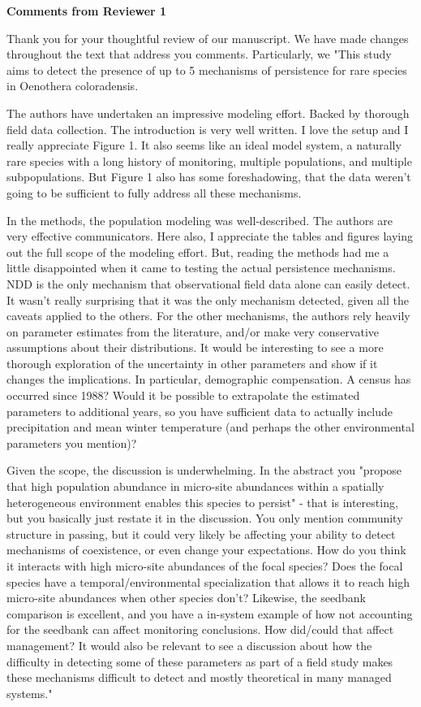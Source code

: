 \documentclass[12pt, letterpaper]{article}
\begin{document}
\textbf{Comments from Reviewer 1}

Thank you for your thoughtful review of our manuscript. We have made changes throughout the text that address you comments. Particularly, we 
"This study aims to detect the presence of up to 5 mechanisms of persistence for rare species in Oenothera coloradensis.

The authors have undertaken an impressive modeling effort. Backed by thorough field data collection.
The introduction is very well written. I love the setup and I really appreciate Figure 1. It also seems like an ideal model system, a naturally rare species with a long history of monitoring, multiple populations, and multiple subpopulations. But Figure 1 also has some foreshadowing, that the data weren't going to be sufficient to fully address all these mechanisms.

In the methods, the population modeling was well-described. The authors are very effective communicators. Here also, I appreciate the tables and figures laying out the full scope of the modeling effort. But, reading the methods had me a little disappointed when it came to testing the actual persistence mechanisms. NDD is the only mechanism that observational field data alone can easily detect. It wasn't really surprising that it was the only mechanism detected, given all the caveats applied to the others.
For the other mechanisms, the authors rely heavily on parameter estimates from the literature, and/or make very conservative assumptions about their distributions.
It would be interesting to see a more thorough exploration of the uncertainty in other parameters and show if it changes the implications.
In particular, demographic compensation. A census has occurred since 1988? Would it be possible to extrapolate the estimated parameters to additional years, so you have sufficient data to actually include precipitation and mean winter temperature (and perhaps the other environmental parameters you mention)?

Given the scope, the discussion is underwhelming. In the abstract you "propose that high population abundance in micro-site abundances within a spatially heterogeneous environment enables this species to persist" - that is interesting, but you basically just restate it in the discussion. You only mention community structure in passing, but it could very likely be affecting your ability to detect mechanisms of coexistence, or even change your expectations. How do you think it interacts with high micro-site abundances of the focal species? Does the focal species have a temporal/environmental specialization that allows it to reach high micro-site abundances when other species don't?
Likewise, the seedbank comparison is excellent, and you have a in-system example of how not accounting for the seedbank can affect monitoring conclusions. How did/could that affect management?
It would also be relevant to see a discussion about how the difficulty in detecting some of these parameters as part of a field study makes these mechanisms difficult to detect and mostly theoretical in many managed systems."
\end{document}
